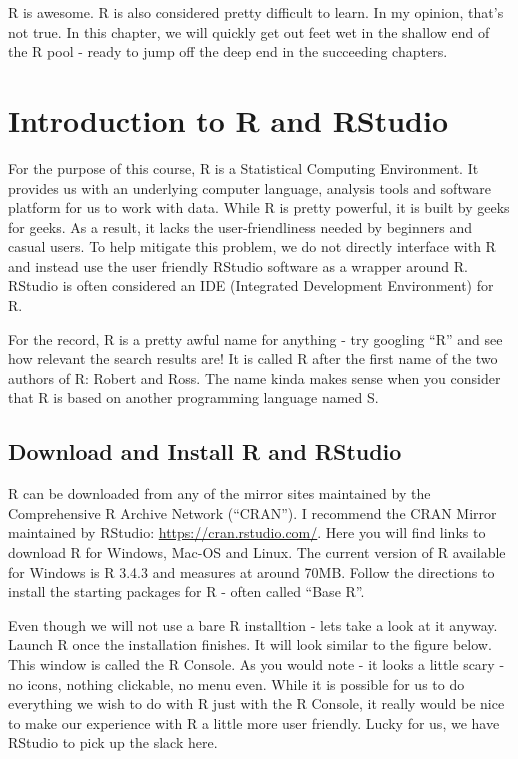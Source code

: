 \documentclass[]{krantz}
\theoremstyle{definition}
\theoremstyle{definition}
\theoremstyle{definition}
\theoremstyle{remark}
\begin{document}
R is awesome. R is also considered pretty difficult to learn. In my
opinion, that's not true. In this chapter, we will quickly get out feet
wet in the shallow end of the R pool - ready to jump off the deep end in
the succeeding chapters.

\section{Introduction to R and
RStudio}\label{introduction-to-r-and-rstudio}

For the purpose of this course, R is a Statistical Computing
Environment. It provides us with an underlying computer language,
analysis tools and software platform for us to work with data. While R
is pretty powerful, it is built by geeks for geeks. As a result, it
lacks the user-friendliness needed by beginners and casual users. To
help mitigate this problem, we do not directly interface with R and
instead use the user friendly RStudio software as a wrapper around R.
RStudio is often considered an IDE (Integrated Development Environment)
for R.

For the record, R is a pretty awful name for anything - try googling
``R'' and see how relevant the search results are! It is called R after
the first name of the two authors of R: Robert and Ross. The name kinda
makes sense when you consider that R is based on another programming
language named S.

\subsection{Download and Install R and
RStudio}\label{download-and-install-r-and-rstudio}

R can be downloaded from any of the mirror sites maintained by the
Comprehensive R Archive Network (``CRAN''). I recommend the CRAN Mirror
maintained by RStudio: \url{https://cran.rstudio.com/}. Here you will
find links to download R for Windows, Mac-OS and Linux. The current
version of R available for Windows is R 3.4.3 and measures at around
70MB. Follow the directions to install the starting packages for R -
often called ``Base R''.

Even though we will not use a bare R installtion - lets take a look at
it anyway. Launch R once the installation finishes. It will look similar
to the figure below. This window is called the R Console. As you would
note - it looks a little scary - no icons, nothing clickable, no menu
even. While it is possible for us to do everything we wish to do with R
just with the R Console, it really would be nice to make our experience
with R a little more user friendly. Lucky for us, we have RStudio to
pick up the slack here.
\end{document}
